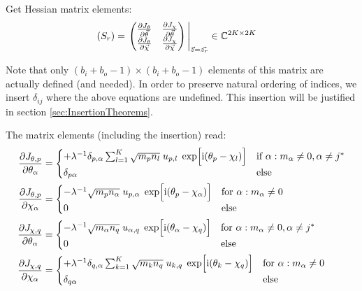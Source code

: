 \documentclass[
	english,
	a4paper,
	fontsize=10pt,
	parskip=half,
	titlepage=true,
	DIV=12,
	final
]{scrreprt}
\newcommand*{\iunit}{\ensuremath{\mathrm{i}}}
\newcommand*{\setComplex}  {\ensuremath{\mathbb{C}}}
\begin{document}
Get Hessian matrix elements:
\begin{align}
	\qty( S_r )
&=
	\eval{
		\begin{pmatrix}
			\pdv{J_{\theta}}{\vec{\theta}} &
			\pdv{J_{\chi  }}{\vec{\theta}} 
			\\
			\pdv{J_{\theta}}{\vec{\chi  }} &
			\pdv{J_{\chi  }}{\vec{\chi  }} 
		\end{pmatrix}
	}_{\vec{z} = \vec{z_r}}
	\in \setComplex^{2K \times 2K}
\end{align}


Note that only $(b_i + b_o - 1) \times (b_i + b_o - 1)$ elements of this matrix are actually defined (and needed). In order to preserve natural ordering of indices, we insert $\delta_{ij}$ where the above equations are undefined. This insertion will be justified in section \ref{sec:InsertionTheorems}.

The matrix elements (including the insertion) read:
\begin{align}
	\pdv{J_{\theta, p}}{\theta_{\alpha}}
&=
	\begin{cases}
		+
		\lambda^{-1}
		\delta_{p,\alpha}
		\sum_{l=1}^{K}
			\sqrt{m_p n_l} \; u_{p,l} \; \exp[\Big. \iunit(\theta_p - \chi_l)]
		&
			\text{if } \alpha : m_\alpha \neq 0, \alpha \neq j^*
		\\
			\delta_{p\alpha}
		&
			\text{else}
	\end{cases}
\\
	\pdv{J_{\theta, p}}{\chi_{\alpha}}
&=
	\begin{cases}
		-
		\lambda^{-1}
		\sqrt{m_p n_\alpha} \; u_{p,\alpha} \; \exp[\Big. \iunit(\theta_p - \chi_\alpha)]
	&
		\text{for } \alpha : m_\alpha \neq 0
	\\
		0
	&
		\text{else}
	\end{cases}
\\
	\pdv{J_{\chi, q}}{\theta_{\alpha}}
&=
	\begin{cases}
		-
		\lambda^{-1}
		\sqrt{m_\alpha n_q} \; u_{\alpha,q} \; \exp[\Big. \iunit(\theta_\alpha - \chi_q)]
	&
		\text{for } \alpha : m_\alpha \neq 0, \alpha \neq j^*
	\\
		0
	&	\text{else}		
	\end{cases}
\\
	\pdv{J_{\chi, q}}{\chi_{\alpha}}
&=
	\begin{cases}
		+
		\lambda^{-1}
		\delta_{q,\alpha}
		\sum_{k=1}^{K}
			\sqrt{m_k n_q} \; u_{k,q} \; \exp[\Big. \iunit(\theta_k - \chi_q)]
	&
		\text{for } \alpha : m_\alpha \neq 0
	\\
		\delta_{q\alpha}
	&
		\text{else}
	\end{cases}
\end{align}
\end{document}
